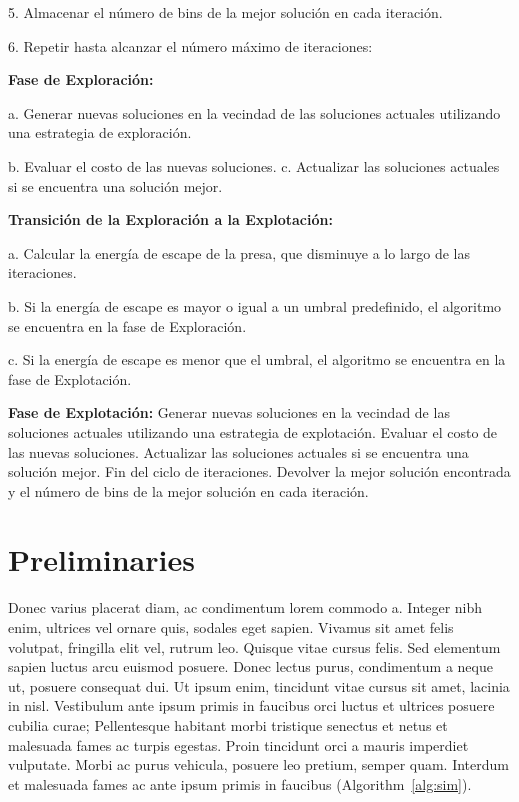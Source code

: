 \documentclass[final,5p,times,twocolumn]{elsarticle}
\begin{document}
5. Almacenar el número de bins de la mejor solución en cada iteración.

6. Repetir hasta alcanzar el número máximo de iteraciones:

\textbf{Fase de Exploración:}

a. Generar nuevas soluciones en la vecindad de las soluciones actuales utilizando una estrategia de exploración.

b. Evaluar el costo de las nuevas soluciones.
c. Actualizar las soluciones actuales si se encuentra una solución mejor.

\textbf{Transición de la Exploración a la Explotación:}


a. Calcular la energía de escape de la presa, que disminuye a lo largo de las iteraciones.

b. Si la energía de escape es mayor o igual a un umbral predefinido, el algoritmo se encuentra en la fase de Exploración.

c. Si la energía de escape es menor que el umbral, el algoritmo se encuentra en la fase de Explotación.

\textbf{Fase de Explotación:}
Generar nuevas soluciones en la vecindad de las soluciones actuales utilizando una estrategia de explotación.
Evaluar el costo de las nuevas soluciones.
Actualizar las soluciones actuales si se encuentra una solución mejor.
Fin del ciclo de iteraciones.
Devolver la mejor solución encontrada y el número de bins de la mejor solución en cada iteración.
\section{Preliminaries}
\label{sec:pl}

Donec varius placerat diam, ac condimentum lorem commodo a. Integer nibh enim, ultrices vel ornare quis, sodales eget sapien. Vivamus sit amet felis volutpat, fringilla elit vel, rutrum leo. Quisque vitae cursus felis. Sed elementum sapien luctus arcu euismod posuere. Donec lectus purus, condimentum a neque ut, posuere consequat dui. Ut ipsum enim, tincidunt vitae cursus sit amet, lacinia in nisl. Vestibulum ante ipsum primis in faucibus orci luctus et ultrices posuere cubilia curae; Pellentesque habitant morbi tristique senectus et netus et malesuada fames ac turpis egestas. Proin tincidunt orci a mauris imperdiet vulputate. Morbi ac purus vehicula, posuere leo pretium, semper quam. Interdum et malesuada fames ac ante ipsum primis in faucibus (Algorithm~\ref{alg:sim}). 
\end{document}
